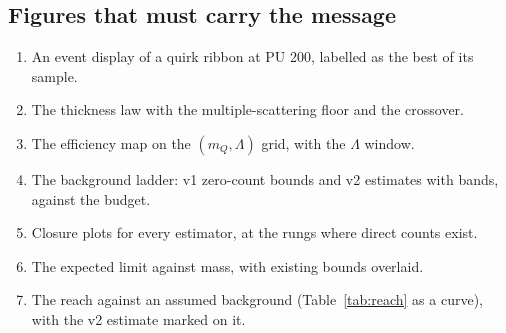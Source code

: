 \documentclass[11pt,a4paper]{article}
\begin{document}
\subsection{Figures that must carry the message}
\begin{enumerate}
  \item An event display of a quirk ribbon at PU 200, labelled as the best of its sample.
  \item The thickness law with the multiple-scattering floor and the crossover.
  \item The efficiency map on the $(m_Q,\Lambda)$ grid, with the $\Lambda$ window.
  \item The background ladder: v1 zero-count bounds and v2 estimates with bands, against the budget.
  \item Closure plots for every estimator, at the rungs where direct counts exist.
  \item The expected limit against mass, with existing bounds overlaid.
  \item The reach against an assumed background (Table~\ref{tab:reach} as a curve), with the v2 estimate marked on it.
\end{enumerate}
\end{document}
